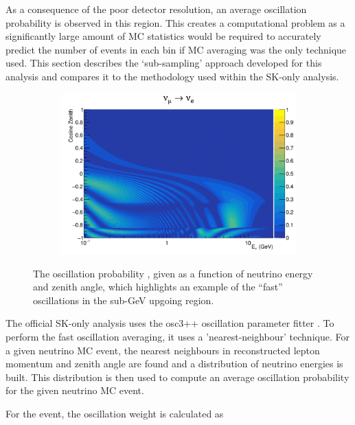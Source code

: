 As a consequence of the poor detector resolution, an average oscillation probability is observed in this region. This creates a computational problem as a significantly large amount of MC statistics would be required to accurately predict the number of events in each bin if MC averaging was the only technique used. This section describes the `sub-sampling' approach developed for this analysis and compares it to the methodology used within the SK-only analysis.

\begin{figure}[h]
  \begin{subfigure}[t]{0.8\textwidth}
    \includegraphics[width=\textwidth, trim={0mm 0mm 0mm 0mm}, clip,page=1]{Figures/Oscillation/FastOscillationExample.pdf}
  \end{subfigure}
  \caption{The oscillation probability , given as a function of neutrino energy and zenith angle, which highlights an example of the ``fast'' oscillations in the sub-GeV upgoing region.}
  \label{fig:Oscillation_SK_FastOscillogram}
\end{figure}

The official SK-only analysis uses the osc3++ oscillation parameter fitter \cite{thesis_roger}. To perform the fast oscillation averaging, it uses a 'nearest-neighbour' technique. For a given neutrino MC event, the nearest neighbours in reconstructed lepton momentum and zenith angle are found and a distribution of neutrino energies is built. This distribution is then used to compute an average oscillation probability for the given neutrino MC event. 

For the  event, the oscillation weight is calculated as

